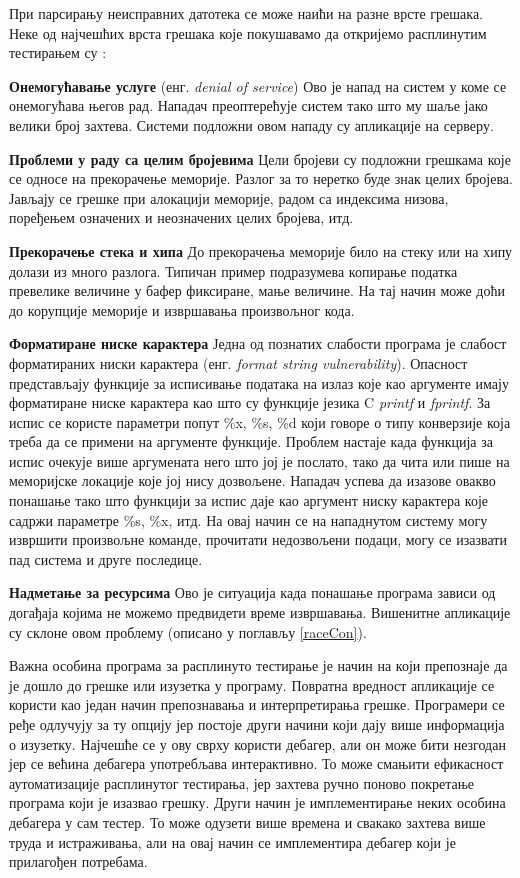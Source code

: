 \documentclass[12pt,oneside]{memoir}
\begin{document}
При парсирању неисправних датотека се може наићи на разне врсте грешака. Неке од најчешћих врста грешака које покушавамо да откријемо расплинутим тестирањем су \cite{fuzzingBrute, fuzzing}:
\begin{description}
\item \textbf{Онемогућавање услуге} (енг. \textit{denial of service}) Ово је напад на систем у коме се онемогућава његов рад. Нападач преоптерећује систем тако што му шаље јако велики број захтева. Системи подложни овом нападу су апликације на серверу.   
\item \textbf{Проблеми у раду са целим бројевима} Цели бројеви су подложни грешкама које се односе на прекорачење меморије. Разлог за то неретко буде знак целих бројева. Јављају се грешке при алокацији меморије, радом са индексима низова, поређењем означених и неозначених целих бројева, итд.
\item \textbf{Прекорачење стека и хипа} До прекорачења меморије било на стеку или на хипу долази из много разлога. Типичан пример подразумева копирање податка превелике величине у бафер фиксиране, мање величине. На тај начин може доћи до корупције меморије и извршавања произвољног кода.
\item \textbf{Форматиране ниске карактера} Једна од познатих слабости програма је слабост форматираних ниски карактера (енг. \textit{format string vulnerability}). Опасност представљају функције за исписивање података на излаз које као аргументе имају форматиране ниске карактера као што су функције језика C \textit{printf} и \textit{fprintf}. За испис се користе параметри попут \%x, \%s, \%d који говоре о типу конверзије која треба да се примени на аргументе функције. Проблем настаје када функција за испис очекује више аргумената него што јој је послато, тако да чита или пише на меморијске локације које јој нису дозвољене. Нападач успева да изазове овакво понашање тако што функцији за испис даје као аргумент ниску карактера које садржи параметре \%s, \%x, итд. На овај начин се на нападнутом систему могу извршити произвољне команде, прочитати недозвољени подаци, могу се изазвати пад система и друге последице. 
\item \textbf{Надметање за ресурсима} Ово је ситуација када понашање програма зависи од догађаја којима не можемо предвидети време извршавања. Вишенитне апликације су склоне овом проблему (описано у поглављу \ref{raceCon}).
\end{description}

Важна особина програма за расплинуто тестирање је начин на који препознаје да је дошло до грешке или изузетка у програму. Повратна вредност апликације се користи као један начин препознавања и  интерпретирања грешке. Програмери се ређе одлучују за ту опцију јер постоје други начини који дају више информација о изузетку. Најчешће се у ову сврху користи дебагер, али он може бити незгодан јер се већина дебагера употребљава интерактивно. То може смањити ефикасност аутоматизације расплинутог тестирања, јер захтева ручно поново покретање програма који је изазвао грешку. Други начин је имплементирање неких особина дебагера у сам тестер. То може одузети више времена и свакако захтева више труда и истраживања, али на овај начин се имплементира дебагер који је прилагођен потребама.
\end{document}
